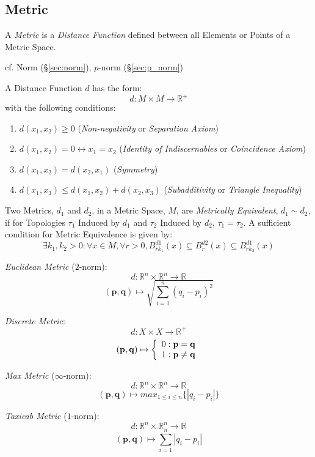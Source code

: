 \subsection{Metric}\label{sec:metric}

A \emph{Metric} is a \emph{Distance Function} defined between all
Elements or Points of a Metric Space.

cf. Norm (\S\ref{sec:norm}), $p$-norm (\S\ref{sec:p_norm})

A Distance Function $d$ has the form:
\[
  d: M \times M \rightarrow \mathbb{R}^{+}
\]
with the following conditions:
\begin{enumerate}
\item $d(x_1, x_2) \geq 0$ (\emph{Non-negativity} or \emph{Separation
  Axiom})
\item $d(x_1, x_2) = 0 \leftrightarrow x_1 = x_2$ (\emph{Identity of
  Indiscernables} or \emph{Coincidence Axiom})
\item $d(x_1, x_2) = d(x_2, x_1)$ (\emph{Symmetry})
\item $d(x_1, x_3) \leq d(x_1, x_2) + d(x_2, x_3)$
  (\emph{Subadditivity} or \emph{Triangle Inequality})
\end{enumerate}
Two Metrics, $d_1$ and $d_2$, in a Metric Space, $M$, are
\emph{Metrically Equivalent}, $d_1 \sim d_2$, if for Topologies
$\tau_1$ Induced by $d_1$ and $\tau_2$ Induced by $d_2$, $\tau_1 =
\tau_2$. A sufficient condition for Metric Equivalence is given by:
\[
  \exists k_1, k_2 > 0 : \forall x \in M, \forall r > 0,
  B^{d1}_{rk_1}(x) \subseteq B^{d2}_r (x) \subseteq B^{d1}_{rk_2}(x)
\]

\emph{Euclidean Metric} ($2$-norm):
\[
  d: \mathbb{R}^n \times \mathbb{R}^n \rightarrow \mathbb{R}
\]\[
  (\mathbf{p},\mathbf{q}) \mapsto \sqrt{\sum_{i=1}^{n}(q_i - p_i)^2}
\]

\emph{Discrete Metric}:
\[
  d: X \times X \rightarrow \mathbb{R}^{+}
\]\[
  (\mathbf{p},\mathbf{q}) \mapsto \left\{
  \begin{array}{l l}
    0: \mathbf{p} = \mathbf{q}\\
    1: \mathbf{p} \neq \mathbf{q}
  \end{array}\right.
\]

\emph{Max Metric} ($\infty$-norm):
\[
  d: \mathbb{R}^n \times \mathbb{R}^n \rightarrow \mathbb{R}
\]\[
  (\mathbf{p},\mathbf{q}) \mapsto max_{1 \leq i \leq n}\{|q_i - p_i|\}
\]

\emph{Taxicab Metric} ($1$-norm):
\[
  d: \mathbb{R}^n \times \mathbb{R}^n \rightarrow \mathbb{R}
\]\[
  (\mathbf{p},\mathbf{q}) \mapsto \sum_{i=1}^{n}|q_i - p_i|
\]

